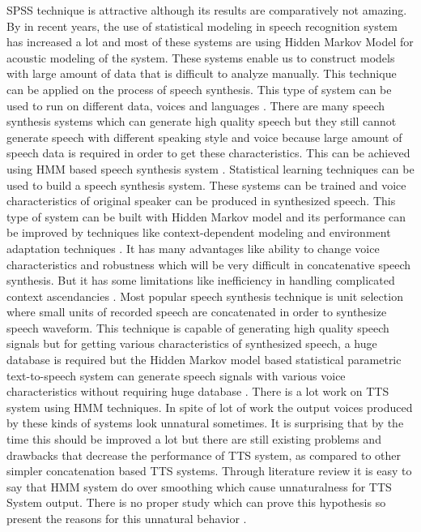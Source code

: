 SPSS technique is attractive although its results are comparatively not amazing. By \cite{donovan1999hidden} in recent years, 
the use of statistical modeling in speech recognition system has increased a lot and most of these
systems are using Hidden Markov Model for acoustic modeling of the system. These systems enable us to construct models
with large amount of data that is difficult to analyze manually. This technique can be applied on the process of speech
synthesis. This type of system can be used to run on different data, voices and languages \cite{donovan1999hidden}. 
There are many speech synthesis systems which can generate high quality speech but they still cannot generate speech
with different speaking style and voice because large amount of speech data is required in order to get these characteristics.
This can be achieved using HMM based speech synthesis system \cite{tokuda2002hmm}. Statistical learning techniques can be
used to build a speech synthesis system. These systems can be trained and voice characteristics of original speaker can be
produced in synthesized speech. This type of system can be built with Hidden Markov model and its performance can be
improved by techniques like context-dependent modeling and environment adaptation techniques \cite{tokuda2000speech}. It has
many advantages like ability to change voice characteristics and robustness which will be very difficult in concatenative
speech synthesis. But it has some limitations like inefficiency in handling complicated context ascendancies \cite{ze2013statistical}. 
Most popular speech synthesis technique is unit selection where small units of recorded speech are concatenated in
order to synthesize speech waveform. This technique is capable of generating high quality speech signals but for getting
various characteristics of synthesized speech, a huge database is required but the Hidden Markov model based statistical
parametric text-to-speech system can generate speech signals with various voice characteristics without requiring huge
database \cite{zen2007hmm}. There is a lot work on TTS system using HMM techniques. In spite of lot of work the output
voices produced by these kinds of systems look unnatural sometimes. It is surprising that by the time this should be improved
a lot but there are still existing problems and drawbacks that decrease the performance of TTS system, as compared to other
simpler concatenation based TTS systems. Through literature review it is easy to say that HMM system do over smoothing
which cause unnaturalness for TTS System output. There is no proper study which can prove this hypothesis so \cite{merritt2013investigating} 
present the reasons for this unnatural behavior \cite{merritt2013investigating}.

